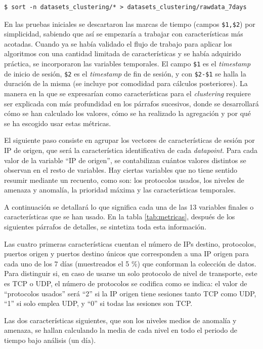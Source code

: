 \begin{verbatim}
$ sort -n datasets_clustering/* > datasets_clustering/rawdata_7days
\end{verbatim}

En las pruebas iniciales se descartaron las marcas de tiempo (campos \verb|$1,$2|) por simplicidad, sabiendo que así se empezaría a trabajar con características más acotadas.
Cuando ya se había validado el flujo de trabajo para aplicar los algoritmos con una cantidad limitada de características y se había adquirido práctica, se incorporaron las variables temporales.
El campo \verb|$1| es el \emph{timestamp} de inicio de sesión, \verb|$2| es el \emph{timestamp} de fin de sesión, y con \verb|$2-$1| se halla la duración de la misma (se incluye por comodidad para cálculos posteriores).
La manera en la que se expresarían como características para el \emph{clustering} requiere ser explicada con más profundidad en los párrafos sucesivos,
donde se desarrollará cómo se han calculado los valores, cómo se ha realizado la agregación y por qué se ha escogido usar estas métricas.

El siguiente paso consiste en agrupar los vectores de características de sesión por IP de origen, que será la característica identificativa de cada \emph{datapoint}.
Para cada valor de la variable ``IP de origen'', se contabilizan cuántos valores distintos se observan en el resto de variables.
Hay ciertas variables que no tiene sentido resumir mediante un recuento, como son: los protocolos usados, los niveles de amenaza y anomalía, la prioridad máxima y las características temporales.

A continuación se detallará lo que significa cada una de las 13 variables finales o características que se han usado.
En la tabla \ref{tab:metricas}, después de los siguientes párrafos de detalles, se sintetiza toda esta información.

Las cuatro primeras características cuentan el número de IPs destino, protocolos, puertos origen y puertos destino únicos que corresponden a una IP origen para cada uno de los 7 días (muestreados el 5 \%) que conforman la colección de datos.
Para distinguir si, en caso de usarse un solo protocolo de nivel de transporte, este es TCP o UDP, el número de protocolos se codifica como se indica:
el valor de ``protocolos usados'' será ``2'' si la IP origen tiene sesiones tanto TCP como UDP, ``1'' si solo emplea UDP, y ``0'' si todas las sesiones son TCP.

Las dos características siguientes, que son los niveles medios de anomalía y amenaza, se hallan calculando la media de cada nivel en todo el periodo de tiempo bajo análisis (un día).


